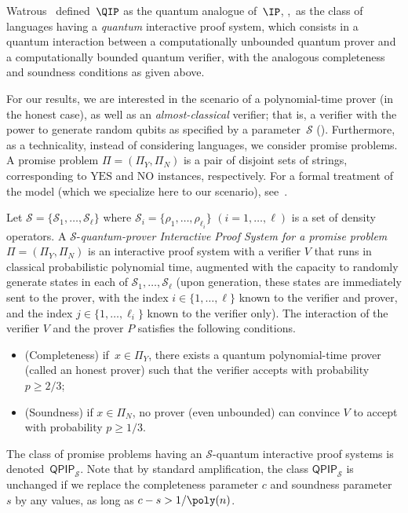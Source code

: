 \documentclass{toc}
\newcommand{\QPIP}{\mathsf{QPIP}}
\newcommand{\calS}{\mathcal{S}}
\begin{document}
Watrous~\cite{Wat03} defined~$\QIP$ as the quantum analogue of~$\IP$, \ie,~as the class of languages having a \emph{quantum} interactive proof system, which consists in a quantum interaction between a
computationally unbounded quantum prover and a computationally bounded quantum verifier, with the analogous completeness and soundness conditions as given above.






For our results, we are interested in the scenario of a polynomial-time prover (in the honest case), as well as  an \emph{almost-classical} verifier; that is, a verifier with the power to generate random qubits as specified by a parameter~$\calS$ (). Furthermore, as a technicality, instead of considering languages, we consider
%
promise problems.  A promise  %
problem $\Pi = (\Pi_Y, \Pi_N)$ %
is a pair of disjoint sets of strings, corresponding to $\text{YES}$ and $\text{NO}$ instances, respectively. For a formal treatment of the model (which we specialize here to our scenario), see~\cite{Wat03}.

\begin{definition}
\label{defn:QPIP-system}
Let $\mathcal{S} = \{\calS_1, \ldots ,\calS_\ell\}$ where $\calS_i = \{\rho_1, \ldots ,\rho_{\ell_i}\}$ $(i=1, \ldots ,\ell)$ is a set of density operators.
A  $\calS$-\emph{quantum-prover Interactive Proof System   for a promise problem $\Pi = (\Pi_Y, \Pi_N)$} is an interactive proof system with a verifier $V$ that  runs in classical probabilistic polynomial time, augmented with the capacity to randomly generate states in each of  $\calS_1, \ldots ,\calS_\ell$ (upon generation, these states are immediately sent to the prover, with the index $ i \in \{1, \ldots ,\ell\}$ known to the verifier and prover, and the index $ j \in \{1, \ldots ,\ell_i\}$ known to the verifier only).
%
%
%
The interaction of the verifier $V$ and the prover $P$
satisfies the following conditions.
\begin{itemize}
 \item (Completeness) if~$x \in \Pi_Y$, there exists a quantum polynomial-time prover (called an honest prover) such that the verifier accepts with probability $p \geq {2}/{3}$;
 \item (Soundness) if $x \in \Pi_N$, no prover (even unbounded) can convince $V$ to accept with probability $p \geq 1/3$.
 \end{itemize}
\end{definition}
The class of promise problems having an  $\calS$-quantum interactive proof systems is denoted~$\QPIP_\calS$. Note that by standard amplification, the class $\QPIP_\calS$  is unchanged if we replace the completeness parameter $c$ and soundness parameter~$s$ by any values, as long as $c-s > {1}/{\poly(n)}$.
\end{document}
